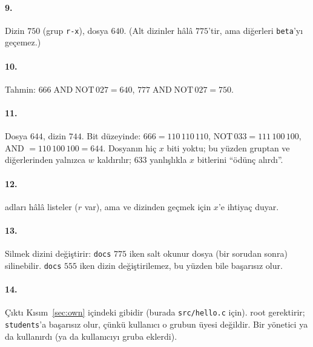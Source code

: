\paragraph{9.} Dizin $750$ (grup \texttt{r-x}), dosya $640$. (Alt dizinler hâlâ $775$'tir, ama diğerleri \texttt{beta}'yı geçemez.)


\paragraph{10.} Tahmin: $666 \mathbin{\text{AND}} \text{NOT}\,027 = 640$, $777 \mathbin{\text{AND}} \text{NOT}\,027 = 750$.


\paragraph{11.} Dosya $644$, dizin $744$. Bit düzeyinde: $666 = 110\,110\,110$, $\text{NOT}\,033 = 111\,100\,100$, AND $= 110\,100\,100 = 644$. Dosyanın hiç $x$ biti yoktu; bu yüzden gruptan ve diğerlerinden yalnızca $w$ kaldırılır; $633$ yanlışlıkla $x$ bitlerini ``ödünç alırdı''.


\paragraph{12.}  adları hâlâ listeler ($r$ var), ama  ve  dizinden geçmek için $x$'e ihtiyaç duyar.


\paragraph{13.} Silmek dizini değiştirir: \texttt{docs} $775$ iken salt okunur dosya (bir sorudan sonra) silinebilir. \texttt{docs} $555$ iken dizin değiştirilemez, bu yüzden  bile başarısız olur.


\paragraph{14.} Çıktı Kısım~\ref{sec:own} içindeki gibidir (burada \texttt{src/hello.c} için).  root gerektirir;  \texttt{students}'a başarısız olur, çünkü kullanıcı o grubun üyesi değildir. Bir yönetici  ya da  kullanırdı (ya da kullanıcıyı gruba eklerdi).

